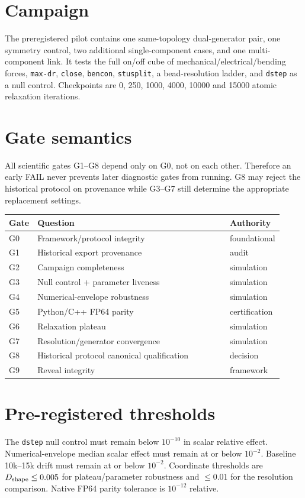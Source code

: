 \documentclass[11pt,a4paper]{article}
\newcommand{\code}[1]{\texttt{#1}}
\begin{document}
\section{Campaign}
The preregistered pilot contains one same-topology dual-generator pair, one symmetry control, two additional single-component cases, and one multi-component link. It tests the full on/off cube of mechanical/electrical/bending forces, \code{max-dr}, \code{close}, \code{bencon}, \code{stusplit}, a bead-resolution ladder, and \code{dstep} as a null control. Checkpoints are 0, 250, 1000, 4000, 10000 and 15000 atomic relaxation iterations.
\section{Gate semantics}
All scientific gates G1--G8 depend only on G0, not on each other. Therefore an early FAIL never prevents later diagnostic gates from running. G8 may reject the historical protocol on provenance while G3--G7 still determine the appropriate replacement settings.
\begin{longtable}{L{0.07\linewidth}L{0.70\linewidth}L{0.15\linewidth}}\toprule Gate&Question&Authority\\\midrule
G0&Framework/protocol integrity&foundational\\
G1&Historical export provenance&audit\\
G2&Campaign completeness&simulation\\
G3&Null control + parameter liveness&simulation\\
G4&Numerical-envelope robustness&simulation\\
G5&Python/C++ FP64 parity&certification\\
G6&Relaxation plateau&simulation\\
G7&Resolution/generator convergence&simulation\\
G8&Historical protocol canonical qualification&decision\\
G9&Reveal integrity&framework\\\bottomrule\end{longtable}
\section{Pre-registered thresholds}
The \code{dstep} null control must remain below $10^{-10}$ in scalar relative effect. Numerical-envelope median scalar effect must remain at or below $10^{-2}$. Baseline 10k--15k drift must remain at or below $10^{-2}$. Coordinate thresholds are $D_{\rm shape}\le0.005$ for plateau/parameter robustness and $\le0.01$ for the resolution comparison. Native FP64 parity tolerance is $10^{-12}$ relative.
\end{document}
